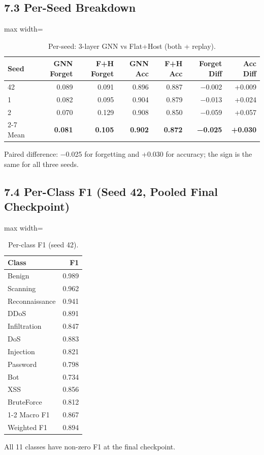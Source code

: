 \documentclass[11pt,a4paper]{article}
\begin{document}
\subsection*{7.3 Per-Seed Breakdown}

\begin{table}[H]
\centering
\caption{Per-seed: 3-layer GNN vs Flat+Host (both + replay).}
\label{tab:per-seed}
\begin{adjustbox}{max width=\textwidth}
\begin{tabular}{lrrrrrr}
\toprule
Seed & GNN Forget & F+H Forget & GNN Acc & F+H Acc & Forget Diff & Acc Diff \\
\midrule
42 & 0.089 & 0.091 & 0.896 & 0.887 & \num{-0.002} & +\num{0.009} \\
1 & 0.082 & 0.095 & 0.904 & 0.879 & \num{-0.013} & +\num{0.024} \\
2 & 0.070 & 0.129 & 0.908 & 0.850 & \num{-0.059} & +\num{0.057} \\
\cmidrule{2-7}
Mean & \textbf{0.081} & \textbf{0.105} & \textbf{0.902} & \textbf{0.872} & \textbf{\num{-0.025}} & \textbf{+\num{0.030}} \\
\bottomrule
\end{tabular}
\end{adjustbox}
\end{table}
Paired difference: \num{-0.025} for forgetting and +\num{0.030} for accuracy; the sign is the same for all three seeds.

\subsection*{7.4 Per-Class F1 (Seed 42, Pooled Final Checkpoint)}

\begin{table}[H]
\centering
\caption{Per-class F1 (seed 42).}
\label{tab:per-class-f1}
\begin{adjustbox}{max width=\textwidth}
\begin{tabular}{lr}
\toprule
Class & F1 \\
\midrule
Benign & 0.989 \\
Scanning & 0.962 \\
Reconnaissance & 0.941 \\
DDoS & 0.891 \\
Infiltration & 0.847 \\
DoS & 0.883 \\
Injection & 0.821 \\
Password & 0.798 \\
Bot & 0.734 \\
XSS & 0.856 \\
BruteForce & 0.812 \\
\cmidrule{1-2}
Macro F1 & 0.867 \\
Weighted F1 & 0.894 \\
\bottomrule
\end{tabular}
\end{adjustbox}
\end{table}
All 11 classes have non-zero F1 at the final checkpoint.
\end{document}
